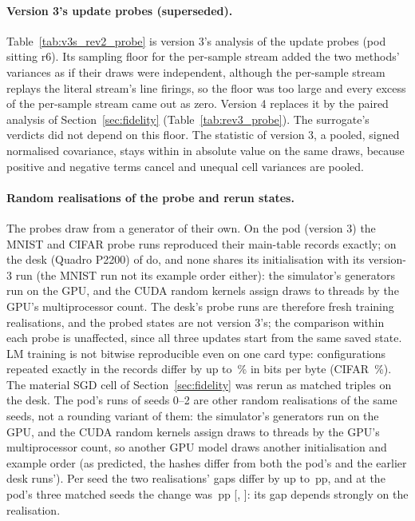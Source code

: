 

\paragraph{Version 3's update probes (superseded).} Table~\ref{tab:v3s_rev2_probe} is version 3's analysis of the update
probes (pod sitting r6). Its sampling floor for the per-sample stream added the two methods' variances as if their draws were
independent, although the per-sample stream replays the literal stream's line firings, so the floor was too large and every
excess of the per-sample stream came out as zero. Version 4 replaces it by the paired analysis of Section~\ref{sec:fidelity}
(Table~\ref{tab:rev3_probe}). The surrogate's verdicts did not depend on this floor.
The statistic of version 3, a pooled, signed normalised covariance, stays within \RYDepVthreePooledMax{} in absolute value on the same draws, because positive and negative terms cancel and unequal cell variances are pooled.

\paragraph{Random realisations of the probe and rerun states.} The probes draw from a generator of their own. On the pod (version 3) the MNIST and CIFAR probe runs reproduced their main-table records exactly; on the desk (Quadro P2200) \RYProbeRunsEqualEThree{} of \RYProbeRunsN{} do, and none shares its initialisation with its version-3 run (the MNIST run not its example order either): the simulator's generators run on the GPU, and the CUDA random kernels assign draws to threads by the GPU's multiprocessor count. The desk's probe runs are therefore fresh training realisations, and the probed states are not version 3's; the comparison within each probe is unaffected, since all three updates start from the same saved state. LM training is not bitwise reproducible even on one card type: configurations repeated exactly in the records differ by up to \RXReproLmMaxPct\,\% in bits per byte (CIFAR \RXReproCifarMaxPct\,\%).
The material SGD cell of Section~\ref{sec:fidelity} was rerun as matched triples on the desk. The pod's runs of seeds 0--2 are other random realisations of the same seeds, not a rounding variant of them: the simulator's generators run on the GPU, and the CUDA random kernels assign draws to threads by the GPU's multiprocessor count, so another GPU model draws another initialisation and example order (as predicted, the hashes differ from both the pod's and the earlier desk runs'). Per seed the two realisations' gaps differ by up to \RZRealGapDiffMax\,pp, and at the pod's three matched seeds the change was \RZPodNThreeD\,pp [\RZPodNThreeDLo, \RZPodNThreeDHi]: its gap depends strongly on the realisation.

